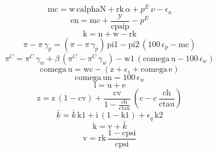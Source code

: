 \begin{dmath}
{{\mathrm{mc}}}={{\mathrm{w}}}\, {{\mathrm{calphaN}}}+{{\mathrm{rk}}}\, {{\alpha}}+{{p^{E}}}\, {{\nu}}-{{\epsilon_{a}}}
\end{dmath}
\begin{dmath}
{{\mathrm{en}}}={{\mathrm{mc}}}+\frac{{{\mathrm{y}}}}{{{\mathrm{cpsip}}}}-{{p^{E}}}
\end{dmath}
\begin{dmath}
{{\mathrm{k}}}={{\mathrm{n}}}+{{\mathrm{w}}}-{{\mathrm{rk}}}
\end{dmath}
\begin{dmath}
{{\pi}}-{{\pi}}\, {{\gamma_{p}}}=\left({{\pi}}-{{\pi}}\, {{\gamma_{p}}}\right)\, {{\mathrm{pi1}}}-{{\mathrm{pi2}}}\, \left(100\, {{\epsilon_{p}}}-{{\mathrm{mc}}}\right)
\end{dmath}
\begin{dmath}
{{\pi^{C}}}={{\pi^{C}}}\, {{\gamma_{w}}}+{{\beta}}\, \left({{\pi^{C}}}-{{\pi^{C}}}\, {{\gamma_{w}}}\right)-{{\mathrm{w1}}}\, \left({{\mathrm{comega}}}\, {{\mathrm{u}}}-100\, {{\epsilon_{w}}}\right)
\end{dmath}
\begin{dmath}
{{\mathrm{comega}}}\, {{\mathrm{u}}}={{\mathrm{wc}}}-\left({{\mathrm{z}}}+{{\epsilon_{s}}}+{{\mathrm{comega}}}\, {{\mathrm{e}}}\right)
\end{dmath}
\begin{dmath}
{{\mathrm{comega}}}\, {{\mathrm{un}}}=100\, {{\epsilon_{w}}}
\end{dmath}
\begin{dmath}
{{\mathrm{l}}}={{\mathrm{u}}}+{{\mathrm{e}}}
\end{dmath}
\begin{dmath}
{{\mathrm{z}}}={{\mathrm{z}}}\, \left(1-{{\mathrm{cv}}}\right)+\frac{{{\mathrm{cv}}}}{1-\frac{{{\mathrm{ch}}}}{{{\mathrm{ctau}}}}}\, \left({{\mathrm{c}}}-{{\mathrm{c}}}\, \frac{{{\mathrm{ch}}}}{{{\mathrm{ctau}}}}\right)
\end{dmath}
\begin{dmath}
{{\bar{k}}}={{\bar{k}}}\, {{\mathrm{k1}}}+{{\mathrm{i}}}\, \left(1-{{\mathrm{k1}}}\right)+{{\epsilon_{q}}}\, {{\mathrm{k2}}}
\end{dmath}
\begin{dmath}
{{\mathrm{k}}}={{\mathrm{v}}}+{{\bar{k}}}
\end{dmath}
\begin{dmath}
{{\mathrm{v}}}={{\mathrm{rk}}}\, \frac{1-{{\mathrm{cpsi}}}}{{{\mathrm{cpsi}}}}
\end{dmath}
